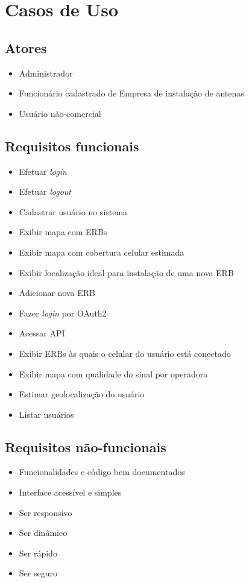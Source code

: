 \documentclass[]{politex}
\begin{document}
\section{Casos de Uso}
\subsection{Atores}
\begin{itemize}
\item Administrador
\item Funcionário cadastrado de Empresa de instalação de antenas
\item Usuário não-comercial
\end{itemize}

\subsection{Requisitos funcionais}
\begin{itemize}
\item Efetuar \textit{login}
\item Efetuar \textit{logout}
\item Cadastrar usuário no sistema
\item Exibir mapa com ERBs
\item Exibir mapa com cobertura celular estimada
\item Exibir localização ideal para instalação de uma nova ERB
\item Adicionar nova ERB
\item Fazer \textit{login} por OAuth2
\item Acessar API
\item Exibir ERBs às quais o celular do usuário está conectado
\item Exibir mapa com qualidade do sinal por operadora
\item Estimar geolocalização do usuário
\item Listar usuários
\end{itemize}

\subsection{Requisitos não-funcionais}
\begin{itemize}
\item Funcionalidades e código bem documentados
\item Interface acessível e simples
\item Ser responsivo
\item Ser dinâmico
\item Ser rápido
\item Ser seguro
\end{itemize}
\end{document}
